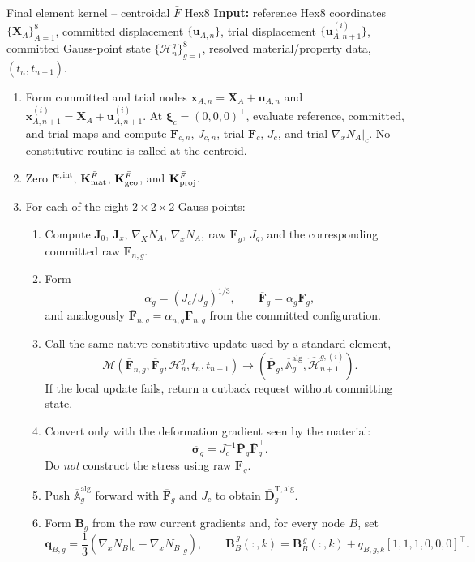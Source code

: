 \documentclass[11pt,a4paper]{article}
\newcommand{\bs}[1]{\boldsymbol{#1}}
\newcommand{\F}{\bs{F}}
\newcommand{\Fb}{\overline{\bs{F}}}
\newcommand{\Pb}{\overline{\bs{P}}}
\newcommand{\Ab}{\overline{\mathbb{A}}^{\mathrm{alg}}}
\newcommand{\sigb}{\overline{\bs{\sigma}}}
\newcommand{\vct}[1]{\mathbf{#1}}
\begin{document}
\begin{algorithmbox}{Final element kernel -- centroidal $\bar F$ Hex8}
\textbf{Input:} reference Hex8 coordinates $\{\bs X_A\}_{A=1}^8$, committed displacement $\{\bs u_{A,n}\}$, trial displacement $\{\bs u_{A,n+1}^{(i)}\}$, committed Gauss-point state $\{\mathcal H_n^g\}_{g=1}^8$, resolved material/property data, $(t_n,t_{n+1})$.

\begin{enumerate}[leftmargin=1.7em,label=\arabic*.,itemsep=0.18em,topsep=0.2em]
\item Form committed and trial nodes $\bs x_{A,n}=\bs X_A+\bs u_{A,n}$ and $\bs x_{A,n+1}^{(i)}=\bs X_A+\bs u_{A,n+1}^{(i)}$. At $\bs\xi_c=(0,0,0)^\top$, evaluate reference, committed, and trial maps and compute $\F_{c,n}$, $J_{c,n}$, trial $\F_c$, $J_c$, and trial $\nabla_xN_A|_c$. No constitutive routine is called at the centroid.
\item Zero $\vct f^{e,\mathrm{int}}$, $\vct K_{\rm mat}^{\bar F}$, $\vct K_{\rm geo}^{\bar F}$, and $\vct K_{\rm proj}^{\bar F}$.
\item For each of the eight $2\times2\times2$ Gauss points:
  \begin{enumerate}[leftmargin=1.5em,label=\alph*.,itemsep=0.12em,topsep=0.1em]
  \item Compute $\vct J_0$, $\vct J_x$, $\nabla_XN_A$, $\nabla_xN_A$, raw $\F_g$, $J_g$, and the corresponding committed raw $\F_{n,g}$.
  \item Form
  \[
  \alpha_g=(J_c/J_g)^{1/3},\qquad \Fb_g=\alpha_g\F_g,
  \]
  and analogously $\Fb_{n,g}=\alpha_{n,g}\F_{n,g}$ from the committed configuration.
  \item Call the same native constitutive update used by a standard element,
  \[
  \mathcal M(\Fb_{n,g},\Fb_g,\mathcal H_n^g,t_n,t_{n+1})
  \longrightarrow(\Pb_g,\Ab_g,\widehat{\mathcal H}_{n+1}^{g,(i)}).
  \]
  If the local update fails, return a cutback request without committing state.
  \item Convert only with the deformation gradient seen by the material:
  \[
  \sigb_g=J_c^{-1}\Pb_g\Fb_g^\top.
  \]
  Do \emph{not} construct the stress using raw $\F_g$.
  \item Push $\Ab_g$ forward with $\Fb_g$ and $J_c$ to obtain $\overline{\vct D}^{\mathrm{T,alg}}_g$.
  \item Form $\vct B_g$ from the raw current gradients and, for every node $B$, set
  \[
  \bs q_{B,g}=\frac13\left(\nabla_xN_B|_c-\nabla_xN_B|_g\right),
  \qquad
  \overline{\vct B}^{\,g}_{B}(:,k)=\vct B^{\,g}_{B}(:,k)+q_{B,g,k}[1,1,1,0,0,0]^\top.
\]
\end{enumerate}
\end{enumerate}
\end{algorithmbox}
\end{document}

